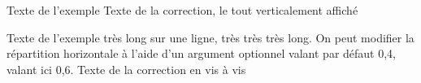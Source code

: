 \begin{exemple*1}
  Texte de l’exemple
  \correction
  Texte de la correction, le tout verticalement affiché
\end{exemple*1}

\begin{exemple}[0.6]
  Texte de l’exemple très long sur une ligne, très très très long.
  On peut modifier la répartition horizontale  à l'aide d'un argument optionnel valant par défaut 0,4, valant ici 0,6.
  \correction
  Texte de la correction en vis à vis
\end{exemple}